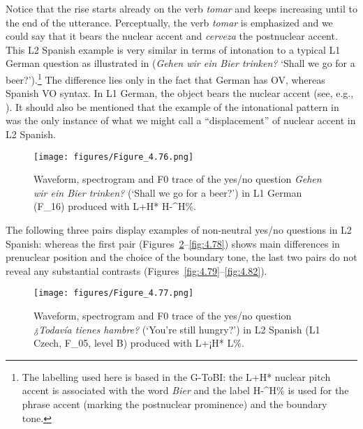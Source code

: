 Notice that the rise starts already on the verb \textit{tomar} and keeps increasing until to the end of the utterance. Perceptually, the verb \textit{tomar} is emphasized and we could say that it bears the nuclear accent and \textit{cerveza} the postnuclear accent. This L2 Spanish example is very similar in terms of intonation to a typical L1 German question as illustrated in  (\textit{Gehen wir ein Bier trinken?} ‘Shall we go for a beer?’).\footnote{The labelling used here is based in the G-ToBI: the L+H* nuclear pitch accent is associated with the word \textit{Bier} and the label H-\^{}H\% is used for the phrase accent (marking the postnuclear prominence) and the boundary tone.} The difference lies only in the fact that German has OV, whereas Spanish VO syntax. In L1 German, the object bears the nuclear accent (see, e.g., \citealt{FéryKügler2008}). It should also be mentioned that the example of the intonational pattern in  was the only instance of what we might call a “displacement” of nuclear accent in L2 Spanish.

\begin{figure}


\texttt{[image: figures/Figure\_4.76.png]}


\caption{Waveform, spectrogram and F0 trace of the yes/no question \textit{Gehen wir ein Bier trinken?} (‘Shall we go for a beer?’) in L1 German (F\_16) produced with L+H* H-\^{}H\%.}
\label{fig:4.76}
\end{figure}

The following three pairs display examples of non-neutral yes/no questions in L2 Spanish: whereas the first pair (Figures~\ref{fig:4.77}--\ref{fig:4.78}) shows main differences in prenuclear position and the choice of the boundary tone, the last two pairs do not reveal any substantial contrasts (Figures~\ref{fig:4.79}--\ref{fig:4.82}).

\begin{figure}


\texttt{[image: figures/Figure\_4.77.png]}



\caption{Waveform, spectrogram and F0 trace of the yes/no question \textit{¿Todavía tienes hambre?} (‘You’re still hungry?’) in L2 Spanish (L1 Czech, F\_05, level B) produced with L+¡H* L\%.}
\label{fig:4.77}
\end{figure}

